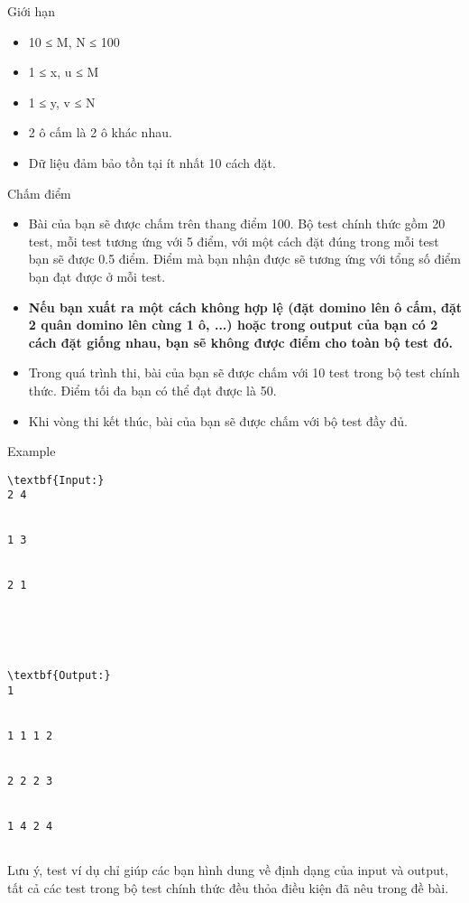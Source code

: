 Giới hạn
\begin{itemize}
	\item     10 ≤ M, N ≤ 100   
	\item     1 ≤ x, u ≤ M   
	\item     1 ≤ y, v ≤ N   
	\item     2 ô cấm là 2 ô khác nhau.   
	\item     Dữ liệu đảm bảo tồn tại ít nhất 10 cách đặt.   
\end{itemize}
Chấm điểm
\begin{itemize}
	\item     Bài của bạn sẽ được chấm trên thang điểm 100. Bộ test chính thức gồm 20 test, mỗi test tương ứng với 5 điểm, với một cách đặt đúng trong mỗi test bạn sẽ được 0.5 điểm. Điểm mà bạn nhận được sẽ tương ứng với tổng số điểm bạn đạt được ở mỗi test.   
	\item \textbf{     Nếu bạn xuất ra một cách không hợp lệ (đặt domino lên ô cấm, đặt 2  quân domino lên cùng 1 ô, ...) hoặc trong output của bạn có 2 cách đặt  giống nhau, bạn sẽ không được điểm cho toàn bộ test đó.    }
	\item     Trong quá trình thi, bài của bạn sẽ được chấm với 10 test trong bộ test chính thức. Điểm tối đa bạn có thể đạt được là 50.   
	\item     Khi vòng thi kết thúc, bài của bạn sẽ được chấm với bộ test đầy đủ.   
\end{itemize}
\begin{itemize}
\end{itemize}
\begin{itemize}
\end{itemize}
Example
\begin{verbatim}
\textbf{Input:}
2 4


1 3


2 1





\textbf{Output:}
1


1 1 1 2


2 2 2 3


1 4 2 4


\end{verbatim}

   Lưu ý, test ví dụ chỉ giúp các bạn hình dung về định dạng của input và output, tất cả các test trong bộ test chính thức đều thỏa điều kiện đã nêu trong đề bài.